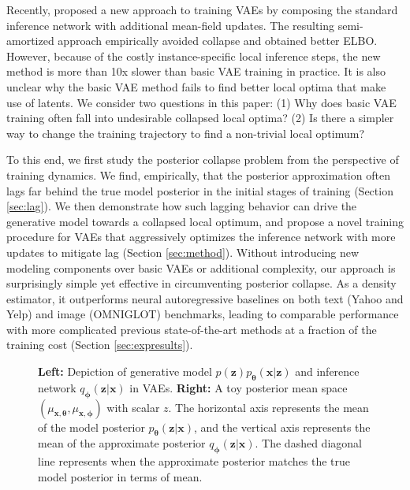 \documentclass{article} \usepackage{iclr2019_conference,times}
\def\rvx{{\mathbf{x}}}
\def\rvz{{\mathbf{z}}}
\def\vtheta{{\bm{\theta}}}
\def\vphi{{\bm{\phi}}}
\newcommand{\qzx}{q_{\vphi}(\rvz|\rvx)}
\newcommand{\pzx}{p_{\vtheta}(\rvz|\rvx)}
\newcommand{\pxz}{p_{\vtheta}(\rvx|\rvz)}
\newcommand{\pz}{p(\rvz)}
\newcommand{\x}{\rvx}
\newcommand{\mut}{\mu_{\x, \vtheta}}
\newcommand{\mup}{\mu_{\x, \vphi}}
\begin{document}
Recently, \citet{kim2018semi} proposed a new approach to training VAEs by composing the standard inference network with additional mean-field updates. The resulting semi-amortized approach empirically avoided collapse and obtained better ELBO. However, because of the costly instance-specific local inference steps, the new method is more than 10x slower than basic VAE training in practice. It is also unclear why the basic VAE method fails to find better local optima that make use of latents.
We consider two questions in this paper:
(1) Why does basic VAE training often fall into undesirable collapsed local optima?
(2) Is there a simpler way to change the training trajectory to find a non-trivial local optimum?

To this end, we first study the posterior collapse problem from the perspective of training dynamics. We find, empirically, that the posterior approximation often lags far behind the true model posterior in the initial stages of training (Section \ref{sec:lag}).
We then demonstrate how such lagging behavior can drive the generative model towards a collapsed local optimum, and propose a novel training procedure for VAEs that aggressively optimizes the inference network with more updates to mitigate lag (Section \ref{sec:method}).
Without introducing new modeling components over basic VAEs or additional complexity, our approach is surprisingly simple yet effective in circumventing posterior collapse.
As a density estimator, it outperforms neural autoregressive baselines on both text (Yahoo and Yelp) and image (OMNIGLOT) benchmarks, leading to comparable performance with more complicated previous state-of-the-art methods at a fraction of the training cost (Section \ref{sec:expresults}).

\begin{figure}[!t]
\centering
    \hspace{2cm}
\caption{\textbf{Left:} Depiction of generative model $\pz\pxz$ and inference network $\qzx$ in VAEs. \textbf{Right:} A toy posterior mean space $(\mut, \mup)$ with scalar $z$. The horizontal axis represents the mean of the model posterior $\pzx$, and the vertical axis represents the mean of the approximate posterior $\qzx$. The dashed diagonal line represents when the approximate posterior matches the true model posterior in terms of mean.}
\vspace{-10pt}
\end{figure}
\end{document}
